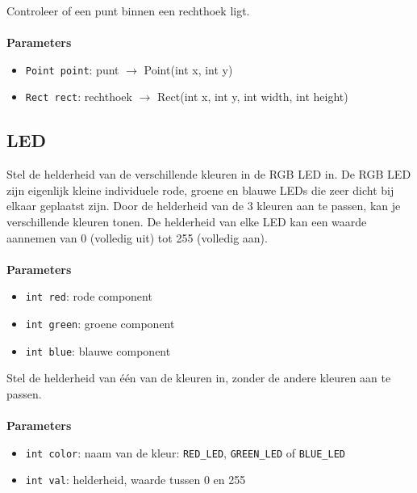 \documentclass[11pt,fleqn]{book} %
\begin{document}
\begin{libf}
	Controleer of een punt binnen een rechthoek ligt.\\ \\
	\textbf{Parameters}
	\begin{itemize}
		\item \texttt{Point point}: punt $\rightarrow$ Point(int x, int y)
		\item \texttt{Rect rect}: rechthoek $\rightarrow$ Rect(int x, int y, int width, int height)
	\end{itemize}
\end{libf}

\subsection{LED}

\begin{libf}
	Stel de helderheid van de verschillende kleuren in de RGB LED in. De RGB LED zijn eigenlijk kleine individuele rode, groene en blauwe LEDs die zeer dicht bij elkaar geplaatst zijn. Door de helderheid van de 3 kleuren aan te passen, kan je verschillende kleuren tonen. 	
	De helderheid van elke LED kan een waarde aannemen van 0 (volledig uit) tot 255 (volledig aan).\\ \\
	\textbf{Parameters}
	\begin{itemize}
		\item \texttt{int red}: rode component
		\item \texttt{int green}: groene component
		\item \texttt{int blue}: blauwe component
	\end{itemize}
\end{libf}

\begin{libf}
	Stel de helderheid van één van de kleuren in, zonder de andere kleuren aan te passen.\\ \\
	\textbf{Parameters}
	\begin{itemize}
		\item \texttt{int color}: naam van de kleur: \texttt{RED\_LED}, \texttt{GREEN\_LED} of \texttt{BLUE\_LED}
		\item \texttt{int val}: helderheid, waarde tussen 0 en 255
	\end{itemize}
\end{libf}
\end{document}
